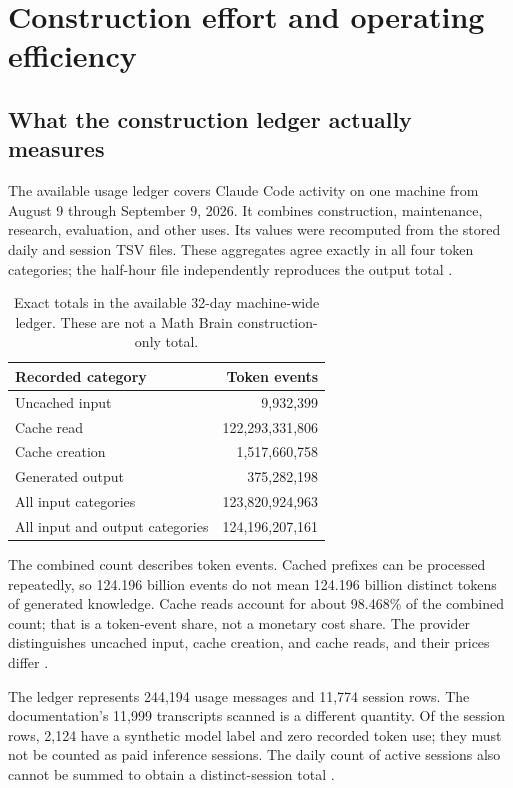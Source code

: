 \section{Construction effort and operating efficiency}
\label{sec:costs}

\subsection{What the construction ledger actually measures}

The available usage ledger covers Claude Code activity on one machine from August 9 through September 9, 2026. It combines construction, maintenance, research, evaluation, and other uses. Its values were recomputed from the stored daily and session TSV files. These aggregates agree exactly in all four token categories; the half-hour file independently reproduces the output total \citep{ledgerdaily,ledgersessions,ledgerhalf,ledgerbuilder}.

\begin{table}[htbp]
\centering
\begin{tabular}{lr}
\toprule Recorded category & Token events\\ \midrule
Uncached input & 9,932,399\\
Cache read & 122,293,331,806\\
Cache creation & 1,517,660,758\\
Generated output & 375,282,198\\
\midrule
All input categories & 123,820,924,963\\
All input and output categories & 124,196,207,161\\
\bottomrule
\end{tabular}
\caption{Exact totals in the available 32-day machine-wide ledger. These are not a Math Brain construction-only total.}
\label{tab:ledger}
\end{table}

The combined count describes token events. Cached prefixes can be processed repeatedly, so 124.196 billion events do not mean 124.196 billion distinct tokens of generated knowledge. Cache reads account for about 98.468\% of the combined count; that is a token-event share, not a monetary cost share. The provider distinguishes uncached input, cache creation, and cache reads, and their prices differ \citep{cacheofficial}.

The ledger represents 244,194 usage messages and 11,774 session rows. The documentation's 11,999 transcripts scanned is a different quantity. Of the session rows, 2,124 have a synthetic model label and zero recorded token use; they must not be counted as paid inference sessions. The daily count of active sessions also cannot be summed to obtain a distinct-session total \citep{ledgerreadme,ledgersessions}.

